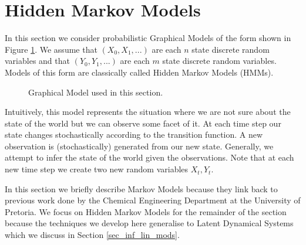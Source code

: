 \section{Hidden Markov Models}
\label{sec_hmm}
In this section we consider probabilistic Graphical Models of the form shown in Figure \ref{fig_linmod}. We assume that  $(X_0, X_1,...)$ are each $n$ state discrete random variables and that $(Y_0, Y_1,...)$ are each $m$ state discrete random variables. Models of this form are classically called Hidden Markov Models (HMMs).
\begin{figure}[H] 
\centering
{}
\caption{Graphical Model used in this section.}
\label{fig_linmod}
\end{figure}
Intuitively, this model represents the situation where we are not sure about the state of the world but we can observe some facet of it. At each time step our state changes stochastically according to the transition function. A new observation is (stochastically) generated from our new state. Generally, we attempt to infer the state of the world given the observations. Note that at each new time step we create two new random variables $X_t, Y_t$.

In this section we briefly describe Markov Models because they link back to previous work done by the Chemical Engineering Department at the University of Pretoria. We focus on Hidden Markov Models for the remainder of the section because the techniques we develop here generalise to Latent Dynamical Systems which we discuss in Section \ref{sec_inf_lin_mods}. 

